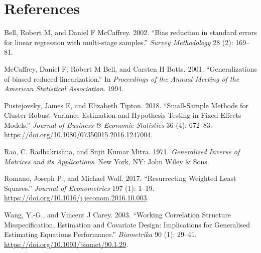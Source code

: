 \documentclass[12pt]{article}
\newlength{\cslhangindent}
\newlength{\cslentryspacingunit} %
\newenvironment{CSLReferences}[2] %
 {%
  \setlength{\parindent}{0pt}
  \ifodd #1
  \let\oldpar\par
  \def\par{\hangindent=\cslhangindent\oldpar}
  \fi
  \setlength{\parskip}{#2\cslentryspacingunit}
 }%
 {}
\begin{document}
\hypertarget{references}{%
\section*{References}\label{references}}

\hypertarget{refs}{}
\begin{CSLReferences}{1}{0}
\leavevmode{}%
Bell, Robert M, and Daniel F McCaffrey. 2002. {``{Bias reduction in
standard errors for linear regression with multi-stage samples}.''}
\emph{Survey Methodology} 28 (2): 169--81.

\leavevmode{}%
McCaffrey, Daniel F, Robert M Bell, and Carsten H Botts. 2001.
{``{Generalizations of biased reduced linearization}.''} In
\emph{Proceedings of the Annual Meeting of the American Statistical
Association}. 1994.

\leavevmode{}%
Pustejovsky, James E, and Elizabeth Tipton. 2018. {``Small-Sample
Methods for Cluster-Robust Variance Estimation and Hypothesis Testing in
Fixed Effects Models.''} \emph{Journal of Business \& Economic
Statistics} 36 (4): 672--83.
\url{https://doi.org/10.1080/07350015.2016.1247004}.

\leavevmode{}%
Rao, C. Radhakrishna, and Sujit Kumar Mitra. 1971. \emph{{Generalized
Inverse of Matrices and its Applications}}. New York, NY: John Wiley \&
Sons.

\leavevmode{}%
Romano, Joseph P., and Michael Wolf. 2017. {``Resurrecting Weighted
Least Squares.''} \emph{Journal of Econometrics} 197 (1): 1--19.
\url{https://doi.org/10.1016/j.jeconom.2016.10.003}.

\leavevmode{}%
Wang, Y.-G., and Vincent J Carey. 2003. {``Working Correlation Structure
Misspecification, Estimation and Covariate Design: Implications for
Generalised Estimating Equations Performance.''} \emph{Biometrika} 90
(1): 29--41. \url{https://doi.org/10.1093/biomet/90.1.29}.

\end{CSLReferences}



\end{document}
